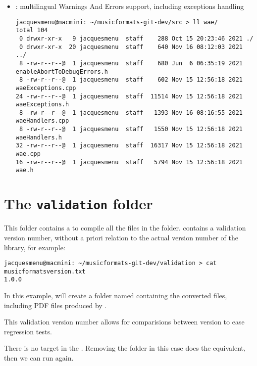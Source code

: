 \begin{itemize}
\item {} : multilingual Warnings And Errors support, including exceptions handling
\begin{lstlisting}[language=Terminal]
jacquesmenu@macmini: ~/musicformats-git-dev/src > ll wae/
total 104
 0 drwxr-xr-x   9 jacquesmenu  staff    288 Oct 15 20:23:46 2021 ./
 0 drwxr-xr-x  20 jacquesmenu  staff    640 Nov 16 08:12:03 2021 ../
 8 -rw-r--r--@  1 jacquesmenu  staff    680 Jun  6 06:35:19 2021 enableAbortToDebugErrors.h
 8 -rw-r--r--@  1 jacquesmenu  staff    602 Nov 15 12:56:18 2021 waeExceptions.cpp
24 -rw-r--r--@  1 jacquesmenu  staff  11514 Nov 15 12:56:18 2021 waeExceptions.h
 8 -rw-r--r--@  1 jacquesmenu  staff   1393 Nov 16 08:16:55 2021 waeHandlers.cpp
 8 -rw-r--r--@  1 jacquesmenu  staff   1550 Nov 15 12:56:18 2021 waeHandlers.h
32 -rw-r--r--@  1 jacquesmenu  staff  16317 Nov 15 12:56:18 2021 wae.cpp
16 -rw-r--r--@  1 jacquesmenu  staff   5794 Nov 15 12:56:18 2021 wae.h
\end{lstlisting}

\end{itemize}


\section{The {\tt validation} folder}

This folder contains a  to compile all the files in the  folder.
 contains a validation version number, without a priori relation to the actual version number of the library, for example:
\begin{lstlisting}[language=Terminal]
jacquesmenu@macmini: ~/musicformats-git-dev/validation > cat musicformatsversion.txt
1.0.0
\end{lstlisting}

In this example,  will create a folder named  containing the converted files, including PDF files produced by .

This validation version number allows for comparisions between version to ease regression tests.

There is no  target in the . Removing the  folder in this case does the equivalent, then we can run  again.




